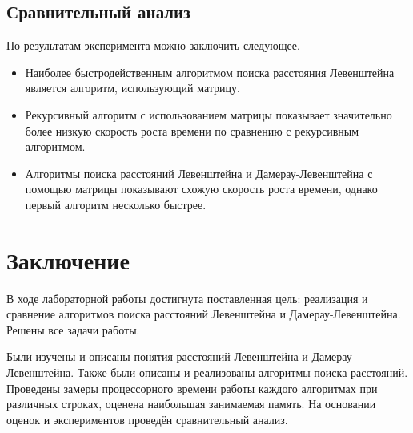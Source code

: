 \documentclass[10pt,a4paper]{report}
\begin{document}
	\section*{Сравнительный анализ}
	По результатам эксперимента можно заключить следующее.
	\begin{itemize}
		\item Наиболее быстродейственным алгоритмом поиска расстояния Левенштейна является алгоритм, использующий матрицу.
		\item Рекурсивный алгоритм с использованием матрицы показывает значительно более низкую скорость роста времени по сравнению с рекурсивным алгоритмом.
		\item Алгоритмы поиска расстояний Левенштейна и Дамерау-Левенштейна с помощью матрицы показывают схожую скорость роста времени, однако первый алгоритм несколько быстрее.
	\end{itemize}


	
	\newpage
	\chapter*{Заключение}
	В ходе лабораторной работы достигнута поставленная цель: реализация и сравнение алгоритмов поиска расстояний Левенштейна и Дамерау-Левенштейна. Решены все задачи работы.
	
	Были изучены и описаны понятия расстояний Левенштейна и Дамерау-Левенштейна. Также были описаны и реализованы алгоритмы поиска расстояний. Проведены замеры процессорного времени работы каждого алгоритмах при различных строках, оценена наибольшая занимаемая память. На основании оценок и экспериментов проведён сравнительный анализ.
	
\end{document}
